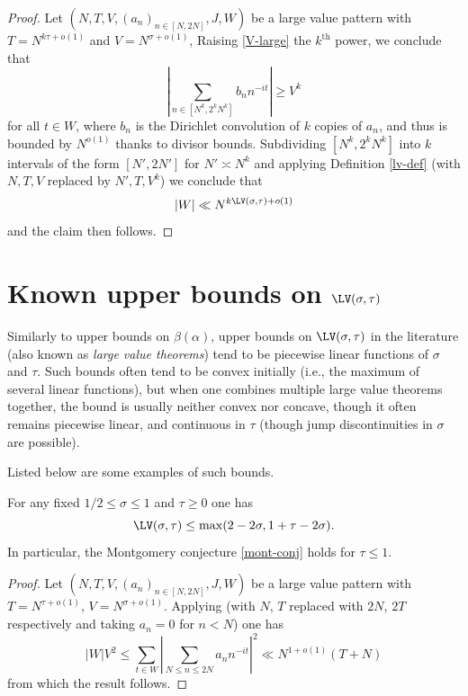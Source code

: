 \begin{proof} Let  $(N,T,V,(a_n)_{n \in [N,2N]},J,W)$ be a large value pattern with $T = N^{k\tau+o(1)}$ and $V = N^{\sigma+o(1)}$, Raising \eqref{V-large} the $k^{\mathrm{th}}$ power, we conclude that
$$ \left|\sum_{n \in [N^k,2^kN^k]} b_n n^{-it} \right| \geq V^k$$
for all $t \in W$, where $b_n$ is the Dirichlet convolution of $k$ copies of $a_n$, and thus is bounded by $N^{o(1)}$ thanks to divisor bounds.  Subdividing $[N^k, 2^k N^k]$ into $k$ intervals of the form $[N',2N']$ for $N' \asymp N^k$ and applying Definition \ref{lv-def} (with $N, T, V$ replaced by $N', T, V^k$) we conclude that
$$ |W| \ll N^{k \LV(\sigma,\tau) + o(1)}$$
and the claim then follows.
\end{proof}

\section{Known upper bounds on \texorpdfstring{$\LV(\sigma,\tau)$}{LV(sigma,tau)}}

Similarly to upper bounds on $\beta(\alpha)$, upper bounds on $\LV(\sigma,\tau)$ in the literature (also known as \emph{large value theorems}) tend to be piecewise linear functions of $\sigma$ and $\tau$.  Such bounds often tend to be convex initially (i.e., the maximum of several linear functions), but when one combines multiple large value theorems together, the bound is usually neither convex nor concave, though it often remains piecewise linear, and continuous in $\tau$ (though jump discontinuities in $\sigma$ are possible).

Listed below are some examples of such bounds.

\begin{theorem}\label{l2-mvt} For any fixed $1/2 \leq \sigma \leq 1$ and $\tau\geq 0$ one has
    $$ \LV(\sigma,\tau) \leq \max( 2-2\sigma, 1 + \tau - 2 \sigma).$$
In particular, the Montgomery conjecture \eqref{mont-conj} holds for $\tau \leq 1$.
\end{theorem}


\begin{proof}
Let $(N,T,V,(a_n)_{n \in [N,2N]},J,W)$ be a large value pattern with $T = N^{\tau + o(1)}$, $V = N^{\sigma + o(1)}$. Applying \cite[Theorem~9.4]{ik} (with $N$, $T$ replaced with $2N$, $2T$ respectively and taking $a_n = 0$ for $n < N$) one has
\[
|W|V^2 \le \sum_{t \in W} \left|\sum_{N \le n \le 2N} a_n n^{-it}\right|^2 \ll N^{1 + o(1)}(T + N)
\]
from which the result follows.
\end{proof}

